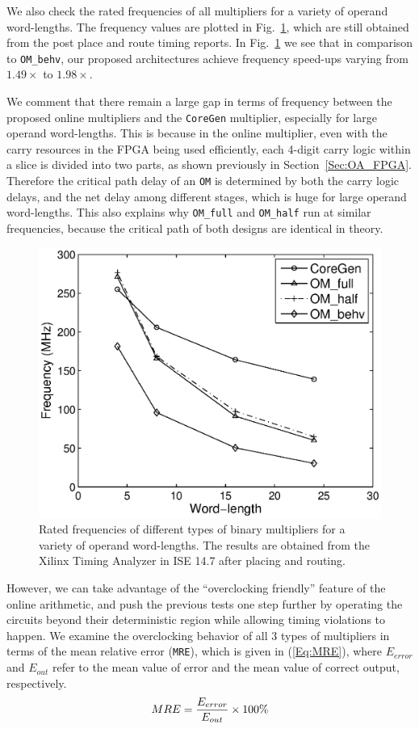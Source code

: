 \documentclass[conference]{IEEEtran}
\begin{document}
We also check the rated frequencies of all multipliers for a variety of operand word-lengths. The frequency values are plotted in Fig.~\ref{Fig:OM_Freq}, which are still obtained from the post place and route timing reports. In Fig.~\ref{Fig:OM_Freq} we see that in comparison to \texttt{OM\_behv}, our proposed architectures achieve frequency speed-ups varying from $1.49\times$ to $1.98\times$.

We comment that there remain a large gap in terms of frequency between the proposed online multipliers and the \texttt{CoreGen} multiplier, especially for large operand word-lengths. This is because in the online multiplier, even with the carry resources in the FPGA being used efficiently, each 4-digit carry logic within a slice is divided into two parts, as shown previously in Section~\ref{Sec:OA_FPGA}. Therefore the critical path delay of an \texttt{OM} is determined by both the carry logic delays, and the net delay among different stages, which is huge for large operand word-lengths. This also explains why \texttt{OM\_full} and \texttt{OM\_half} run at similar frequencies, because the critical path of both designs are identical in theory.

\begin{figure}[tbp]
	\centering
	\includegraphics[width=.48\textwidth]{./Figures/Exp/OM_Freq2.eps}
	\vspace{-3ex}
	\caption{Rated frequencies of different types of binary multipliers for a variety of operand word-lengths. The results are obtained from the Xilinx Timing Analyzer in ISE 14.7 after placing and routing.}
	\vspace{-2ex}
	\label{Fig:OM_Freq}
\end{figure}

However, we can take advantage of the ``overclocking friendly'' feature of the online arithmetic, and push the previous tests one step further by operating the circuits beyond their deterministic region while allowing timing violations to happen. We examine the overclocking behavior of all 3 types of multipliers in terms of the mean relative error (\texttt{MRE}), which is given in (\ref{Eq:MRE}), where $E_{error}$ and $E_{out}$ refer to the mean value of error and the mean value of correct output, respectively.
%
\begin{eqnarray}\label{Eq:MRE}
  MRE=\frac{E_{error}}{E_{out}}\times100\%
  \vspace{-1.5ex}
\end{eqnarray}
\end{document}
